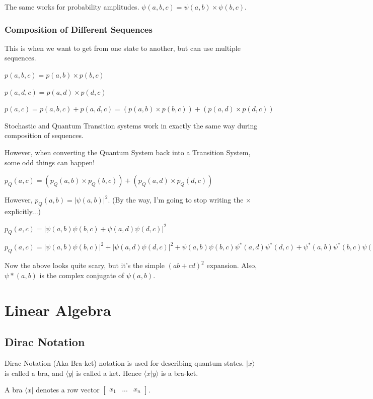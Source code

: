 \documentclass[12pt]{article}
\begin{document}
The same works for probability amplitudes. $\psi(a, b, c) = \psi(a, b) \times \psi(b, c)$.

\subsubsection{Composition of Different Sequences}

This is when we want to get from one state to another, but can use multiple sequences. 

$p(a, b, c) = p(a, b) \times p(b, c)$

$p(a, d, c) = p(a, d) \times p(d, c)$

$p(a, c) = p(a, b, c) + p(a, d, c) = (p(a, b) \times p(b, c)) + (p(a, d) \times p(d, c))$

Stochastic and Quantum Transition systems work in exactly the same way during composition of sequences.

However, when converting the Quantum System back into a Transition System, some odd things can happen!

$p_Q(a, c) = (p_Q(a, b) \times p_Q(b, c)) + (p_Q(a, d) \times p_Q(d, c))$

However, $p_Q(a, b) = |\psi(a, b)|^2$. (By the way, I'm going to stop writing the $\times$ explicitly...)

$p_Q(a,c) = \lvert \psi(a,b)\psi(b,c) + \psi(a,d)\psi(d, c) \rvert^2$

$p_Q(a,c) = \lvert \psi(a,b)\psi(b,c) \rvert^2 + \lvert \psi(a,d)\psi(d,c) \rvert^2 + \psi(a,b)\psi(b,c)\psi^*(a,d)\psi^*(d,c) + \psi^*(a,b)\psi^*(b,c)\psi(a,d)\psi(d,c)$

Now the above looks quite scary, but it's the simple $(ab + cd)^2$ expansion. Also, $\psi*(a,b)$ is the complex conjugate of $\psi(a,b)$.

\section{Linear Algebra}

\subsection{Dirac Notation}

Dirac Notation (Aka Bra-ket) notation is used for describing quantum states. $\lvert x \rangle$ is called a bra, and $\langle y \rvert$ is called a ket. Hence $\langle x \vert y \rangle$ is a bra-ket.

A bra $\langle x \rvert$ denotes a row vector $\begin{bmatrix}x_1 & ... & x_n\end{bmatrix}$.
\end{document}

